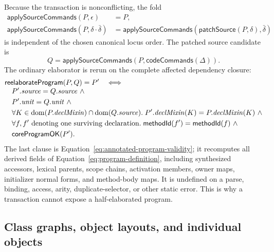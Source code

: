 Because the transaction is nonconflicting, the fold
\begin{equation}\label{eq:apply-source-commands}
\begin{aligned}
 \mathsf{applySourceCommands}(P,\epsilon)&=P,\\
 \mathsf{applySourceCommands}(P,\delta\cdot\bar\delta)
   &=\mathsf{applySourceCommands}(\mathsf{patchSource}(P,\delta),\bar\delta)
\end{aligned}
\end{equation}
is independent of the chosen canonical locus order.  The patched source
candidate is
\begin{equation}\label{eq:patched-source-candidate}
 Q=\mathsf{applySourceCommands}(P,\mathsf{codeCommands}(\Delta)).
\end{equation}
The ordinary elaborator is rerun on the complete affected dependency closure:
\begin{equation}\label{eq:reflective-reelaboration}
 \begin{aligned}
 &\mathsf{reelaborateProgram}(P,Q)=P'
 \quad\Longleftrightarrow\\[-1mm]
 &\quad P'.\mathit{source}=Q.\mathit{source}\ \land\\
 &\quad P'.\mathit{unit}=Q.\mathit{unit}\ \land\\
 &\quad \forall K\in\mathop{\mathrm{dom}}(P.\mathit{declMixin})\cap\mathop{\mathrm{dom}}(Q.\mathit{source}).\;
    P'.\mathit{declMixin}(K)=P.\mathit{declMixin}(K)\ \land\\
 &\quad \forall f,f'\text{ denoting one surviving declaration}.\;
    \mathsf{methodId}(f')=\mathsf{methodId}(f)\ \land\\
 &\quad \mathsf{coreProgramOK}(P').
 \end{aligned}
\end{equation}
The last clause is Equation~\eqref{eq:annotated-program-validity}; it
recomputes all derived fields of
Equation~\eqref{eq:program-definition}, including synthesized accessors,
lexical parents, scope chains, activation members, owner maps, initializer
normal forms, and method-body maps.  It is undefined on a parse, binding,
access, arity, duplicate-selector, or other static error.  This is why a
transaction cannot expose a half-elaborated program.

\subsection{Class graphs, object layouts, and individual objects}

